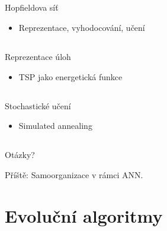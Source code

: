 \documentclass{beamer}
\begin{document}
\subsection{}
\begin{frame}{Hopfieldova síť}
\begin{itemize}
\item Reprezentace, vyhodocování, učení
\end{itemize}
\end{frame}

\subsection{}
\begin{frame}{Reprezentace úloh}
\begin{itemize}
\item TSP jako energetická funkce
\end{itemize}
\end{frame}

\subsection{}
\begin{frame}{Stochastické učení}
\begin{itemize}
\item Simulated annealing
\end{itemize}
\end{frame}

\subsection{}
\begin{frame}{Otázky?}
\begin{center}
Příště: Samoorganizace v rámci ANN.
\end{center}
\end{frame}

\section{Evoluční algoritmy}
\end{document}
